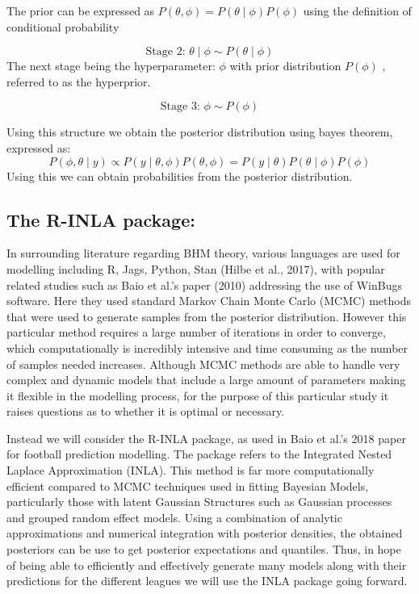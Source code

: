 \documentclass[
]{article}
\begin{document}
The prior can be expressed as
\(P(\theta,\phi) = P(\theta\mid\phi)P(\phi)\) using the definition of
conditional probability

\[\text{Stage 2: }\theta\mid\phi \sim P(\theta\mid\phi)\] The next stage
being the hyperparameter: \(\phi\) with prior distribution \(P(\phi)\) ,
referred to as the hyperprior.

\[\text{Stage 3: } \phi \sim P(\phi)\]

Using this structure we obtain the posterior distribution using bayes
theorem, expressed as:
\[P(\phi,\theta\mid y)  \propto P(y \mid\theta,\phi) P(\theta,\phi) = P(y\mid\theta ) P(\theta \mid\phi ) P(\phi)\]
Using this we can obtain probabilities from the posterior distribution.

\hypertarget{the-r-inla-package}{%
\subsection{The R-INLA package:}\label{the-r-inla-package}}

In surrounding literature regarding BHM theory, various languages are
used for modelling including R, Jags, Python, Stan (Hilbe et al., 2017),
with popular related studies such as Baio et al.'s paper (2010)
addressing the use of WinBugs software. Here they used standard Markov
Chain Monte Carlo (MCMC) methods that were used to generate samples from
the posterior distribution. However this particular method requires a
large number of iterations in order to converge, which computationally
is incredibly intensive and time consuming as the number of samples
needed increases. Although MCMC methods are able to handle very complex
and dynamic models that include a large amount of parameters making it
flexible in the modelling process, for the purpose of this particular
study it raises questions as to whether it is optimal or necessary.

Instead we will consider the R-INLA package, as used in Baio et al.'s
2018 paper for football prediction modelling. The package refers to the
Integrated Nested Laplace Approximation (INLA). This method is far more
computationally efficient compared to MCMC techniques used in fitting
Bayesian Models, particularly those with latent Gaussian Structures such
as Gaussian processes and grouped random effect models. Using a
combination of analytic approximations and numerical integration with
posterior densities, the obtained posteriors can be use to get posterior
expectations and quantiles. Thus, in hope of being able to efficiently
and effectively generate many models along with their predictions for
the different leagues we will use the INLA package going forward.
\end{document}
